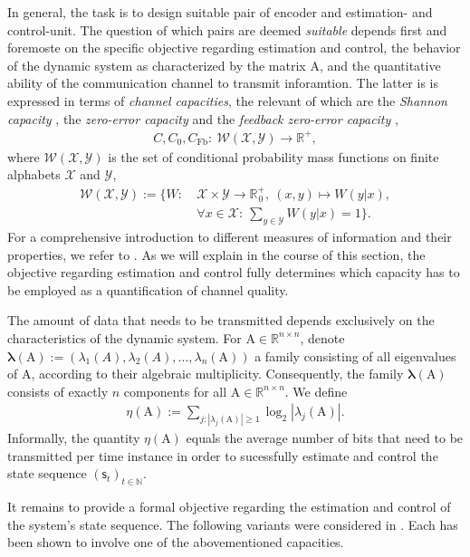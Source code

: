 \documentclass[conference]{IEEEtran}
\newcommand{\rss}{(\mathsf{s}_t)_{t\in\NN}}
\def\X{{\mathcal X}}
\def\Y{{\mathcal Y}}
\def\W{{\mathcal W}}
\def\NN{{\mathbb N}}
\def\RR{{\mathbb R}}
\def\mA{\bm{\mathrm{A}}}
\begin{document}
	In general, the task is to design suitable pair of encoder and estimation- and control-unit. The question of which pairs are deemed \emph{suitable} 
	depends first and foremoste on the specific objective regarding estimation and control, the behavior of the dynamic system as characterized by the matrix \(\mA\), 
	and the quantitative ability of the communication channel to transmit inforamtion. The latter is is expressed in terms of \emph{channel capacities}, the 
	relevant of which are the \emph{Shannon capacity} \cite{Sh48}, the \emph{zero-error capacity} \cite{Sh56} and the \emph{feedback zero-error capacity} \cite{Sh56}, 
	\begin{align*} C, C_{0}, C_{\text{Fb}}:~ \W(\X,\Y) \rightarrow \RR_{\hspace{1pt}}^{+},
	\end{align*}
	where \(\W(\X,\Y)\) is the set of conditional probability mass functions on finite alphabets \(\X\) and \(\Y\),
	\begin{align*}	\W(\X,\Y)	:=	\bigg\{ W: 	&~\X \times \Y \rightarrow\RR_{\hspace{1pt}0}^+,~ (x,y) \mapsto W(y|x),\\
												&~\forall x\in\X: ~{\sum}_{y\in\Y} W(y|x) = 1 \bigg\}.
	\end{align*}
	For a comprehensive introduction to different measures of information and their properties, we refer to \cite{CsKo11}.  
	As we will explain in the course of this section, the objective regarding estimation and control fully determines 
	which capacity has to be employed as a quantification of channel quality.
	
	The amount of data that needs to be transmitted depends exclusively on the characteristics of the dynamic system. 
	For \(\mA \in \RR^{n\times n}\), denote \(\bm{\lambda}(\mA) := (\lambda_1(A),\lambda_2(A),\ldots,\lambda_n(\mA))\) a family 
	consisting of all eigenvalues of \(\mA\), according to their algebraic multiplicity. Consequently, the family \(\bm{\lambda}(\mA)\)
	consists of exactly \(n\) components for all \(\mA\in \RR^{n\times n}\). We define
	\begin{align}	\eta(\mA):={\sum}_{j:|\lambda_j(\mA)|\geq 1} \log_2|\lambda_j(\mA)|.
	\end{align}
	Informally, the quantity \(\eta(\mA)\) equals the average number of bits that need to be transmitted per time instance in order
	to sucessfully estimate and control the state sequence \(\rss\).
	
	It remains to provide a formal objective regarding the estimation and control of the system's state sequence. The following variants were considered
	in \cite{MS07, MS07SC}. Each has been shown to involve one of the abovementioned capacities.
	
\end{document}
